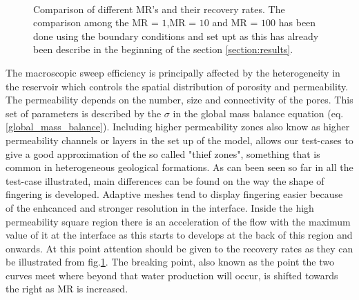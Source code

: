 \documentclass[preprint,authoryear,12pt]{elsarticle}
\begin{document}
{\begin{figure}[h]
\begin{center}
{}%
\\ 
\end{center}
\caption{Comparison of different MR's and their recovery rates. The comparison among the MR = $1$,MR = $10$ and MR = $100$ has been done using the boundary conditions and set upt as this has already been describe in the beginning of the section \ref{section:results}. }
\label{fig:recoveryrates}
\end{figure}

The macroscopic sweep efficiency is principally affected by the heterogeneity in the reservoir which controls the spatial distribution of porosity and permeability. The permeability depends on the number, size and connectivity of the pores. This set of parameters is described by the $\sigma$ in the global mass balance equation (eq.\ref{global_mass_balance}). Including higher permeability zones also know as higher permeability channels or layers in the set up of the model, allows our test-cases to give a good approximation of the so called "thief zones", something that is common in heterogeneous geological formations. 
As can been seen so far in all the test-case illustrated, main differences can be found on the way the shape of fingering is developed. Adaptive meshes tend to display fingering easier because of the enhcanced and stronger resolution in the interface. Inside the high permeability square region there is an acceleration of the flow with the maximum value of it at the interface as this starts to develops at the back of this region and onwards. At this point attention should be given to the recovery rates as they can be illustrated from fig.{\ref{fig:recoveryrates}}. The breaking point, also known as the point the two curves meet where beyond that water production will occur, is shifted towards the right as MR is increased.

}
\end{document}
